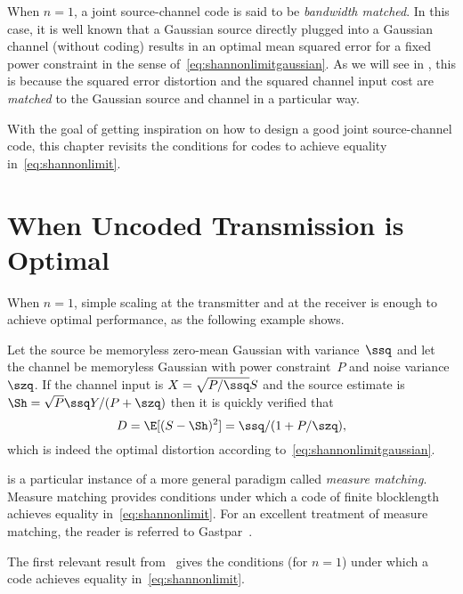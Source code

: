 When $n=1$, a joint source-channel code is said to be \emph{bandwidth matched}.
In this case, it is well known that a Gaussian source directly plugged into a
Gaussian channel (without coding) results in an optimal mean squared error for a
fixed power constraint in the sense of~\eqref{eq:shannonlimitgaussian}. As we
will see in , this is because the squared error distortion and
the squared channel input cost are \emph{matched} to the Gaussian source and
channel in a particular way. 

With the goal of getting inspiration on how to design a good joint
source-channel code, this chapter revisits the conditions for codes to achieve
equality in~\eqref{eq:shannonlimit}.


\section{When Uncoded Transmission is Optimal}\label{sec:bwmatch}

When $n=1$, simple scaling at the transmitter and at the receiver is enough to
achieve optimal performance, as the following example shows.

\begin{example}
  \label{ex:gausssingle}
  Let the source be memoryless zero-mean Gaussian with variance~$\ssq$ and let
  the channel be memoryless Gaussian with power constraint~$P$ and noise
  variance~$\szq$. If the channel input is $X = \sqrt{P/\ssq} S$ and the source
  estimate is $\Sh = \sqrt{P} \ssq Y / (P + \szq)$ then it is quickly verified
  that 
  \begin{equation*}
    D = \E[(S - \Sh)^2] = \ssq / (1 + P/\szq),
  \end{equation*}
  which is indeed the optimal distortion according
  to~\eqref{eq:shannonlimitgaussian}.
\end{example}

 is a particular instance of a more general paradigm called
\emph{measure matching}. Measure matching provides conditions under which a code
of finite blocklength achieves equality in~\eqref{eq:shannonlimit}.
For an excellent treatment of measure matching, the reader is referred to
Gastpar~\cite{GastparRV2003,GastparThesis}.

The first relevant result from~\cite{GastparRV2003} gives the conditions (for
$n=1$) under which a code achieves equality in~\eqref{eq:shannonlimit}.

